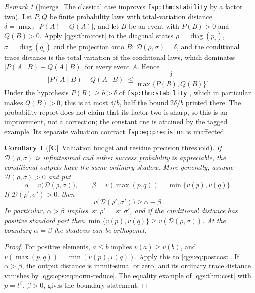 \documentclass[11pt,oneside]{article}
\numberwithin{equation}{section}
\theoremstyle{plain}
\newtheorem{corollary}[corollary]{Corollary}
\theoremstyle{definition}
\theoremstyle{remark}
\newtheorem{remark}[remark]{Remark}
\newcommand{\TD}{\mathcal D}
\DeclareMathOperator{\st}{st}
\DeclareMathOperator{\diag}{diag}
\newcommand{\abs}[1]{\left|#1\right|}
\newcommand{\TC}{\textcolor{TierC}{\textsf{\bfseries[C]}}}
\newcommand{\merge}{{\small\textsf{[merge]}}}
\begin{document}
\begin{remark}[\merge\ The classical case improves \texttt{fsp:thm:stability} by a factor two]\label{qgs:mrg:rem:fsp}
Let $P,Q$ be finite probability laws with total-variation distance $\delta=\max_A\abs{P(A)-Q(A)}$, and let $B$ be an event with $P(B)>0$ and $Q(B)>0$. Apply \cref{qgs:thm:cost} to the diagonal states $\rho=\diag(p_i)$, $\sigma=\diag(q_i)$ and the projection onto $B$: $\TD(\rho,\sigma)=\delta$, and the conditional trace distance is the total variation of the conditional laws, which dominates $\abs{P(A\mid B)-Q(A\mid B)}$ for every event $A$. Hence
\[
 \abs{P(A\mid B)-Q(A\mid B)}\le\frac{\delta}{\max\{P(B),Q(B)\}}.
\]
Under the hypothesis $P(B)\ge b>\delta$ of \texttt{fsp:thm:stability} \cite{repoProbability}, which in particular makes $Q(B)>0$, this is at most $\delta/b$, half the bound $2\delta/b$ printed there. The probability report does not claim that its factor two is sharp, so this is an improvement, not a correction; the constant one is attained by the tagged example. Its separate valuation contract \texttt{fsp:eq:precision} is unaffected.
\end{remark}

\begin{corollary}[\TC\ Valuation budget and residue precision threshold]\label{qgs:cor:budget}\label{qgs:ops:cor:distance-scale}
If $\TD(\rho,\sigma)$ is infinitesimal and either success probability is appreciable, the conditional outputs have the same ordinary shadow. More generally, assume $\TD(\rho,\sigma)>0$ and put
\[
 \alpha=v\bigl(\TD(\rho,\sigma)\bigr),\qquad
 \beta=v(\max(p,q))=\min\{v(p),v(q)\}.
\]
If $\TD(\rho',\sigma')>0$, then
\begin{equation}\label{qgs:ops:eq:precision}
 v\bigl(\TD(\rho',\sigma')\bigr)\ge\alpha-\beta.
\end{equation}
In particular, $\alpha>\beta$ implies $\st\rho'=\st\sigma'$, and if the conditional distance has positive standard part then $\min\{v(p),v(q)\}\ge v(\TD(\rho,\sigma))$. At the boundary $\alpha=\beta$ the shadows can be orthogonal.
\end{corollary}
\begin{proof}
For positive elements, $a\le b$ implies $v(a)\ge v(b)$, and $v(\max(p,q))=\min(v(p),v(q))$. Apply this to \eqref{qgs:eq:postcost}. If $\alpha>\beta$, the output distance is infinitesimal or zero, and its ordinary trace distance vanishes by \eqref{qgs:ops:eq:norm-reduce}. The equality example of \cref{qgs:thm:cost} with $p=t^\beta$, $\beta>0$, gives the boundary statement.
\end{proof}
\end{document}
